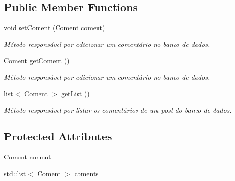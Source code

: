 \subsection*{Public Member Functions}
\begin{DoxyCompactItemize}
\item 
void \hyperlink{class_coment_command_a7dcbcf61c4dcbb080881535ba1093711}{set\-Coment} (\hyperlink{class_coment}{Coment} \hyperlink{class_coment_command_aeeadc825656bf9e76ce0ea3f721749e0}{coment})
\begin{DoxyCompactList}\small\item\em Método responsável por adicionar um comentário no banco de dados. \end{DoxyCompactList}\item 
\hypertarget{class_coment_command_a4ce5a7ad5abb44fbe6951dd10c576f67}{\hyperlink{class_coment}{Coment} \hyperlink{class_coment_command_a4ce5a7ad5abb44fbe6951dd10c576f67}{get\-Coment} ()}\label{class_coment_command_a4ce5a7ad5abb44fbe6951dd10c576f67}

\begin{DoxyCompactList}\small\item\em Método responsável por adicionar um comentário no banco de dados. \end{DoxyCompactList}\item 
\hypertarget{class_coment_command_a2e31acac5682b142fdff5dc5ebee7e93}{list$<$ \hyperlink{class_coment}{Coment} $>$ \hyperlink{class_coment_command_a2e31acac5682b142fdff5dc5ebee7e93}{get\-List} ()}\label{class_coment_command_a2e31acac5682b142fdff5dc5ebee7e93}

\begin{DoxyCompactList}\small\item\em Método responsável por listar os comentários de um post do banco de dados. \end{DoxyCompactList}\end{DoxyCompactItemize}
\subsection*{Protected Attributes}
\begin{DoxyCompactItemize}
\item 
\hyperlink{class_coment}{Coment} \hyperlink{class_coment_command_aeeadc825656bf9e76ce0ea3f721749e0}{coment}
\item 
std\-::list$<$ \hyperlink{class_coment}{Coment} $>$ \hyperlink{class_coment_command_ad0ae90b7aacb5dc53857351855845488}{coments}
\end{DoxyCompactItemize}

